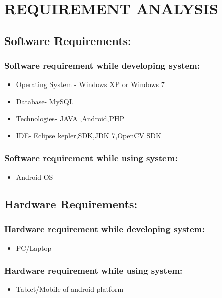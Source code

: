 \chapter{REQUIREMENT ANALYSIS}

\section{Software Requirements: }
\subsection{Software requirement while developing system: }
\begin{itemize}
\item Operating System  - Windows XP or Windows 7
\item Database- MySQL
\item Technologies- JAVA ,Android,PHP
\item IDE- Eclipse kepler,SDK,JDK 7,OpenCV SDK
\end{itemize}

\subsection{Software requirement while using system: }
\begin{itemize}
\item Android OS
\end{itemize}

\section{Hardware Requirements: }
\subsection{Hardware requirement while developing system: }
\begin{itemize}
\item PC/Laptop
\end{itemize}

\subsection{Hardware requirement while using system: }
\begin{itemize}
\item Tablet/Mobile of android platform
\end{itemize}

